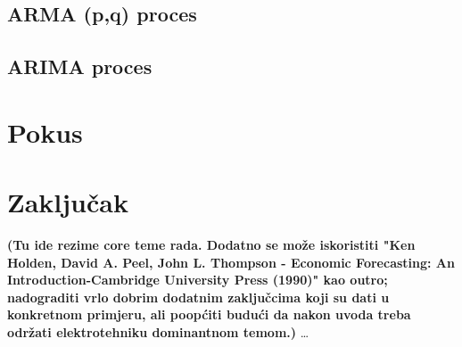 \documentclass[a4paper,12pt,oneside]{memoir}
\begin{document}
        \section{ARMA (p,q) proces}
        \section{ARIMA proces}
    \chapter{Pokus}
    \chapter{Zaključak}
        \textbf{(Tu ide rezime core teme rada. Dodatno se može iskoristiti "Ken Holden, David A. Peel, John L. Thompson - Economic Forecasting: An Introduction-Cambridge University Press (1990)" kao outro; nadograditi vrlo dobrim dodatnim zaključcima koji su dati u konkretnom primjeru, ali poopćiti budući da nakon uvoda treba održati elektrotehniku dominantnom temom.)} %
        \ldots{}
\end{document}
